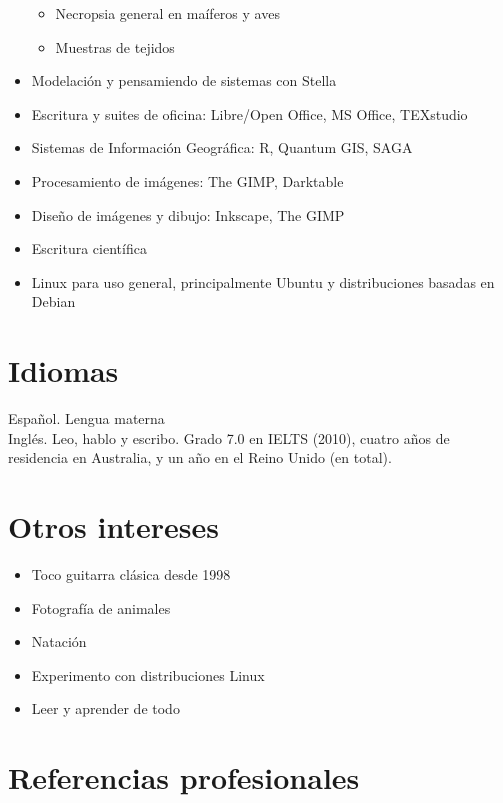 \documentclass[11pt, letter]{article}
\begin{document}
\begin{itemize}
\begin{itemize}
		\item Necropsia general en ma\'iferos y aves
		\item Muestras de tejidos
	\end{itemize}
	\item Modelaci\'on y pensamiendo de sistemas con Stella
	\item Escritura y suites de oficina: Libre/Open Office, MS Office, TEXstudio
	\item Sistemas de Informaci\'on Geogr\'afica: R, Quantum GIS, SAGA
	\item Procesamiento de im\'agenes: The GIMP, Darktable
	\item Dise\~no de im\'agenes y dibujo: Inkscape, The GIMP
	\item Escritura cient\'ifica
	\item Linux para uso general, principalmente Ubuntu y distribuciones basadas en Debian
\end{itemize}

\section*{Idiomas}

{\sc Espa\~nol}. Lengua materna\\
{\sc Ingl\'es}. Leo, hablo y escribo. Grado 7.0 en IELTS (2010), cuatro a\~nos de residencia en Australia, y un a\~no en el Reino Unido (en total).\\

\section*{Otros intereses}

\begin{itemize}
	\item Toco guitarra cl\'asica desde 1998
	\item Fotograf\'ia de animales
	\item Nataci\'on
	\item Experimento con distribuciones Linux
	\item Leer y aprender de todo
\end{itemize}


\section*{Referencias profesionales}
\end{document}
